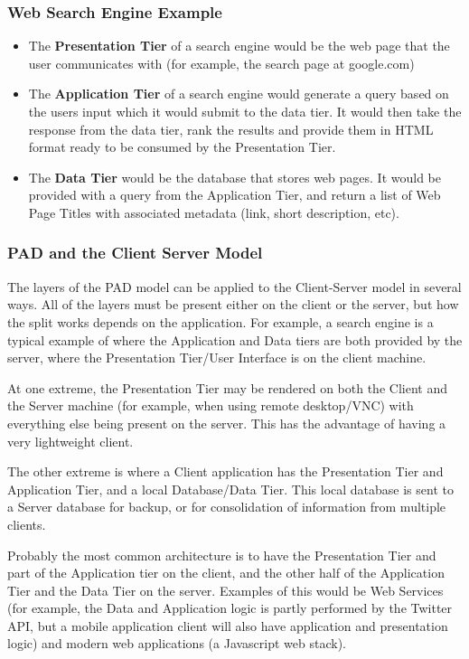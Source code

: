 \documentclass{article}
\begin{document}
\subsubsection{Web Search Engine Example}
\begin{itemize}
    \item The \textbf{Presentation Tier} of a search engine would be the web page that the user communicates with (for example, the search page at google.com)
    \item The \textbf{Application Tier} of a search engine would generate a query based on the users input which it would submit to the data tier. It would then take the response from the data tier, rank the results and provide them in HTML format ready to be consumed by the Presentation Tier.
    \item The \textbf{Data Tier} would be the database that stores web pages. It would be provided with a query from the Application Tier, and return a list of Web Page Titles with associated metadata (link, short description, etc).
\end{itemize}

\subsubsection{PAD and the Client Server Model}
The layers of the PAD model can be applied to the Client-Server model in several ways. All of the layers must be present either on the client or the server, but how the split works depends on the application. For example, a search engine is a typical example of where the Application and Data tiers are both provided by the server, where the Presentation Tier/User Interface is on the client machine. 

At one extreme, the Presentation Tier may be rendered on both the Client and the Server machine (for example, when using remote desktop/VNC) with everything else being present on the server. This has the advantage of having a very lightweight client.

The other extreme is where a Client application has the Presentation Tier and Application Tier, and a local Database/Data Tier. This local database is sent to a Server database for backup, or for consolidation of information from multiple clients. 

Probably the most common architecture is to have the Presentation Tier and part of the Application tier on the client, and the other half of the Application Tier and the Data Tier on the server. Examples of this would be Web Services (for example, the Data and Application logic is partly performed by the Twitter API, but a mobile application client will also have application and presentation logic) and modern web applications (a Javascript web stack).
\end{document}
